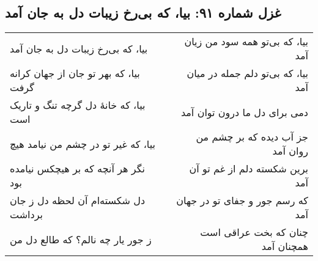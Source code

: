 \begin{center}
\section*{غزل شماره ۹۱: بیا، که بی‌رخ زیبات دل به جان آمد}
\label{sec:091}
\begin{longtable}{l p{0.5cm} r}
بیا، که بی‌رخ زیبات دل به جان آمد
&&
بیا، که بی‌تو همه سود من زیان آمد
\\
بیا، که بهر تو جان از جهان کرانه گرفت
&&
بیا، که بی‌تو دلم جمله در میان آمد
\\
بیا، که خانهٔ دل گرچه تنگ و تاریک است
&&
دمی برای دل ما درون توان آمد
\\
بیا، که غیر تو در چشم من نیامد هیچ
&&
جز آب دیده که بر چشم من روان آمد
\\
نگر هر آنچه که بر هیچکس نیامده بود
&&
برین شکسته دلم از غم تو آن آمد
\\
دل شکسته‌ام آن لحظه دل ز جان برداشت
&&
که رسم جور و جفای تو در جهان آمد
\\
ز جور یار چه نالم؟ که طالع دل من
&&
چنان که بخت عراقی است همچنان آمد
\\
\end{longtable}
\end{center}
